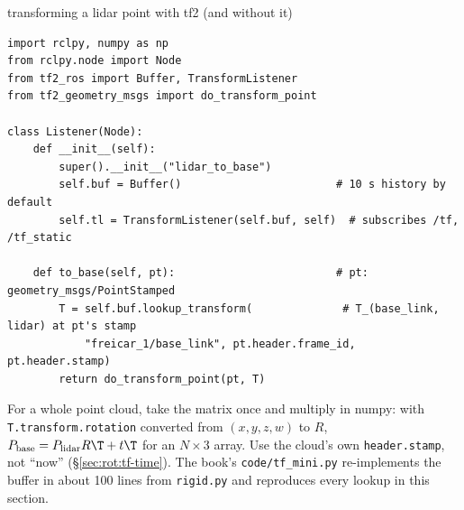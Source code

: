 \begin{example}{transforming a lidar point with tf2 (and without it)}
\begin{verbatim}
import rclpy, numpy as np
from rclpy.node import Node
from tf2_ros import Buffer, TransformListener
from tf2_geometry_msgs import do_transform_point

class Listener(Node):
    def __init__(self):
        super().__init__("lidar_to_base")
        self.buf = Buffer()                        # 10 s history by default
        self.tl = TransformListener(self.buf, self)  # subscribes /tf, /tf_static

    def to_base(self, pt):                         # pt: geometry_msgs/PointStamped
        T = self.buf.lookup_transform(              # T_(base_link, lidar) at pt's stamp
            "freicar_1/base_link", pt.header.frame_id, pt.header.stamp)
        return do_transform_point(pt, T)
\end{verbatim}
For a whole point cloud, take the matrix once and multiply in numpy: with \texttt{T.transform.rotation} converted from $(x,y,z,w)$ to $R$, $P_{\text{base}}=P_{\text{lidar}}R\T+t\T$ for an $N\times3$ array. Use the cloud's own \texttt{header.stamp}, not ``now'' (\S\ref{sec:rot:tf-time}). The book's \texttt{code/tf\_mini.py} re-implements the buffer in about 100 lines from \texttt{rigid.py} and reproduces every lookup in this section.
\end{example}
